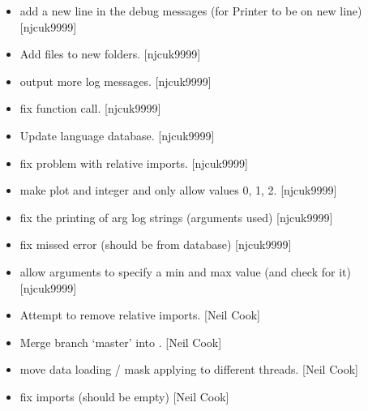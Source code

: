 \documentclass[a4paper,10pt,english]{report}
\begin{document}
\begin{itemize}
\item {} 
 \sphinxhyphen{} add a new line in the debug messages (for Printer to
be on new line) {[}njcuk9999{]}

\item {} 
Add  files to new folders. {[}njcuk9999{]}

\item {} 
 \sphinxhyphen{} output more log messages. {[}njcuk9999{]}

\item {} 
 \sphinxhyphen{} fix function call. {[}njcuk9999{]}

\item {} 
Update language database. {[}njcuk9999{]}

\item {} 
 \sphinxhyphen{} fix problem with relative imports.
{[}njcuk9999{]}

\item {} 
 \sphinxhyphen{} make plot and integer and only allow values 0,
1, 2. {[}njcuk9999{]}

\item {} 
 \sphinxhyphen{} fix the printing of arg log strings (arguments used)
{[}njcuk9999{]}

\item {} 
 \sphinxhyphen{} fix missed error (should be from database) {[}njcuk9999{]}

\item {} 
 \sphinxhyphen{} allow arguments to specify a min and max value (and
check for it) {[}njcuk9999{]}

\item {} 
Attempt to remove relative imports. {[}Neil Cook{]}

\item {} 
Merge branch ‘master’ into . {[}Neil Cook{]}

\item {} 
 \sphinxhyphen{} move data loading / mask applying to different
threads. {[}Neil Cook{]}

\item {} 
 \sphinxhyphen{} fix imports (should be empty) {[}Neil Cook{]}


\end{itemize}
\end{document}

